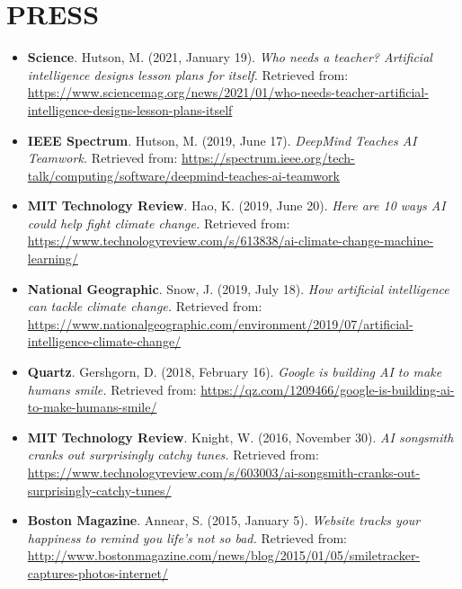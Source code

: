 \documentclass[paper=letter,fontsize=11pt]{scrartcl} %
\newcommand{\NewPart}[2]{\section*{\uppercase{#1} #2}}
\newcommand{\PressEntry}[5]{
		\noindent \textbf{#5}. #1 (#2). \textit{#3} Retrieved from: \url{#4}}
\begin{document}
\NewPart{Press}{}
\begin{itemize}
\item\PressEntry{Hutson, M.}{2021, January 19}{Who needs a teacher? Artificial intelligence designs lesson plans for itself.}{https://www.sciencemag.org/news/2021/01/who-needs-teacher-artificial-intelligence-designs-lesson-plans-itself}{Science}

\item\PressEntry{Hutson, M.}{2019, June 17}{DeepMind Teaches AI Teamwork.}{https://spectrum.ieee.org/tech-talk/computing/software/deepmind-teaches-ai-teamwork}{IEEE Spectrum}

\item\PressEntry{Hao, K.}{2019, June 20}{Here are 10 ways AI could help fight climate change.}{https://www.technologyreview.com/s/613838/ai-climate-change-machine-learning/}{MIT Technology Review}

\item\PressEntry{Snow, J.}{2019, July 18}{How artificial intelligence can tackle climate change.}{https://www.nationalgeographic.com/environment/2019/07/artificial-intelligence-climate-change/}{National Geographic}

\item\PressEntry{Gershgorn, D.}{2018, February 16}{Google is building AI to make humans smile.}{https://qz.com/1209466/google-is-building-ai-to-make-humans-smile/}{Quartz}

\item\PressEntry{Knight, W.}{2016, November 30}{AI songsmith cranks out surprisingly catchy tunes.}{https://www.technologyreview.com/s/603003/ai-songsmith-cranks-out-surprisingly-catchy-tunes/}{MIT Technology Review}

\item\PressEntry{Annear, S.}{2015, January 5}{Website tracks your happiness to remind you life’s not so bad.}{http://www.bostonmagazine.com/news/blog/2015/01/05/smiletracker-captures-photos-internet/}{Boston Magazine}

\end{itemize}


\end{document}

